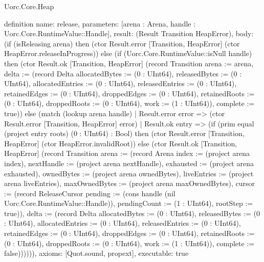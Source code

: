 \begin{lexlean}{Uorc.Core.Heap}
\begin{semanticmodule}
definition{
  name: release,
  parameters: [arena : Arena, handle : Uorc.Core.RuntimeValue::Handle],
  result: (Result Transition HeapError),
  body: (if (isReleasing arena) then (ctor Result.error [Transition, HeapError] (ctor HeapError.releaseInProgress)) else (if (Uorc.Core.RuntimeValue::isNull handle) then (ctor Result.ok [Transition, HeapError] (record Transition {arena := arena, delta := (record Delta {allocatedBytes := (0 : UInt64), releasedBytes := (0 : UInt64), allocatedEntries := (0 : UInt64), releasedEntries := (0 : UInt64), retainedEdges := (0 : UInt64), droppedEdges := (0 : UInt64), retainedRoots := (0 : UInt64), droppedRoots := (0 : UInt64), work := (1 : UInt64)}), complete := true})) else (match (lookup arena handle)
    | Result.error error => (ctor Result.error [Transition, HeapError] error)
    | Result.ok entry => (if (prim equal (project entry roots) (0 : UInt64) : Bool) then (ctor Result.error [Transition, HeapError] (ctor HeapError.invalidRoot)) else (ctor Result.ok [Transition, HeapError] (record Transition {arena := (record Arena {index := (project arena index), nextHandle := (project arena nextHandle), exhausted := (project arena exhausted), ownedBytes := (project arena ownedBytes), liveEntries := (project arena liveEntries), maxOwnedBytes := (project arena maxOwnedBytes), cursor := (record ReleaseCursor {pending := (cons handle (nil Uorc.Core.RuntimeValue::Handle)), pendingCount := (1 : UInt64), rootStep := true})}), delta := (record Delta {allocatedBytes := (0 : UInt64), releasedBytes := (0 : UInt64), allocatedEntries := (0 : UInt64), releasedEntries := (0 : UInt64), retainedEdges := (0 : UInt64), droppedEdges := (0 : UInt64), retainedRoots := (0 : UInt64), droppedRoots := (0 : UInt64), work := (1 : UInt64)}), complete := false})))))),
  axioms: [Quot.sound, propext],
  executable: true
}


\end{semanticmodule}
\end{lexlean}
